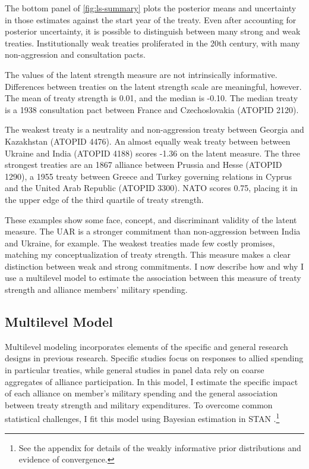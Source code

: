 \documentclass[12pt]{article}
\begin{document}
	
The bottom panel of \autoref{fig:ls-summary} plots the posterior means and uncertainty in those estimates against the start year of the treaty. 
Even after accounting for posterior uncertainty, it is possible to distinguish between many strong and weak treaties. 
Institutionally weak treaties proliferated in the 20th century, with many non-aggression and consultation pacts. 


The values of the latent strength measure are not intrinsically informative. 
Differences between treaties on the latent strength scale are meaningful, however. 
The mean of treaty strength is 0.01, and the median is -0.10. 
The median treaty is a 1938 consultation pact between France and Czechoslovakia (ATOPID 2120). 


The weakest treaty is a neutrality and non-aggression treaty between Georgia and Kazakhstan (ATOPID 4476).  
An almost equally weak treaty between between Ukraine and India (ATOPID 4188) scores -1.36 on the latent measure.
The three strongest treaties are an 1867 alliance between Prussia and Hesse (ATOPID 1290), a 1955 treaty between Greece and Turkey governing relations in Cyprus and the United Arab Republic (ATOPID 3300).  
NATO scores 0.75, placing it in the upper edge of the third quartile of treaty strength.  


These examples show some face, concept, and discriminant validity of the latent measure. 
The UAR is a stronger commitment than non-aggression between India and Ukraine, for example. 
The weakest treaties made few costly promises, matching my conceptualization of treaty strength. 
This measure makes a clear distinction between weak and strong commitments. 
I now describe how and why I use a multilevel model to estimate the association between this measure of treaty strength and alliance members' military spending.  


\subsection{Multilevel Model} 


Multilevel modeling incorporates elements of the specific and general research designs in previous research. 
Specific studies focus on responses to allied spending in particular treaties, while general studies in panel data rely on coarse aggregates of alliance participation.
In this model, I estimate the specific impact of each alliance on member's military spending and the general association between treaty strength and military expenditures. 
To overcome common statistical challenges, I fit this model using Bayesian estimation in STAN \citep{Carpenteretal2016}.\footnote{See the appendix for details of the weakly informative prior distributions and evidence of convergence.}
\end{document}
